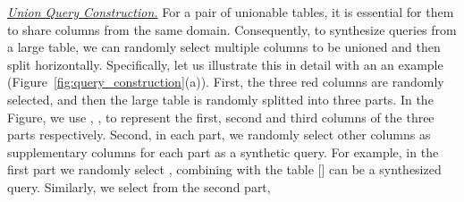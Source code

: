 \noindent \underline{\textit{Union Query Construction.}}
 For a pair of unionable tables, it is essential for them to share columns from the same domain. 
  Consequently, to synthesize queries from a large table, we can randomly select multiple columns to be unioned and then split  horizontally. Specifically, let us illustrate this in detail with an an example (Figure~\ref{fig:query_construction}(a)). 
  First, the three red columns are randomly selected, and then the large table is randomly splitted into three parts. In the Figure, we use   ,
   \textcolor{red}{},
  \textcolor{green}{} to represent the first, second and third columns of the three parts respectively.
  Second, in each part, we randomly select other  columns as supplementary columns for each part as a synthetic query. For example, in the first part we randomly select , combining with  
  the table [] can be a synthesized query. 
  Similarly, we select  \textcolor{red}{}\textcolor{red}{} from the second part, 
